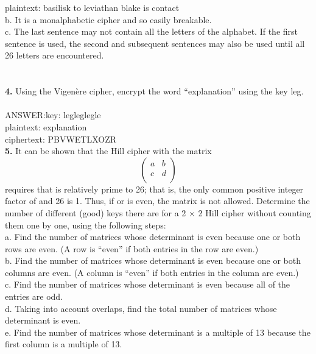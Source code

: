\documentclass[paper=a4, fontsize=11pt]{scrartcl} %
\numberwithin{equation}{section} %
\numberwithin{figure}{section} %
\numberwithin{table}{section} %
\begin{document}
plaintext:   basilisk to leviathan blake is contact\\
        b.      It is a monalphabetic cipher and so easily breakable.\\
        c.      The last sentence may not contain all the letters of the alphabet. If the first sentence is used, the second and subsequent sentences may also be used until all 26 letters are encountered.\\
\\
\\
\textbf{4.} Using the Vigenère cipher, encrypt the word “explanation” using the key leg.\\
\\
ANSWER:key:     legleglegle\\
    plaintext:  explanation\\
        ciphertext:     PBVWETLXOZR\\
\textbf{5.} It can be shown that the Hill cipher with the matrix
\begin{equation}       %
\left(                 %
  \begin{array}{cc}   %
    a & b\\  %
    c & d\\  %
  \end{array}
\right)                 %
\end{equation}
requires that is relatively prime to 26; that is, the only common positive integer factor of and 26 is 1. Thus, if or is even, the matrix is not allowed. Determine the number of different (good) keys there are for a 2 × 2 Hill cipher without counting them one by one, using the following steps:\\
a. Find the number of matrices whose determinant is even because one or both rows are even. (A row is “even” if both entries in the row are even.)\\
b. Find the number of matrices whose determinant is even because one or both columns are even. (A column is “even” if both entries in the column are even.)\\
c. Find the number of matrices whose determinant is even because all of the entries are odd.\\
d. Taking into account overlaps, find the total number of matrices whose determinant is even.\\
e. Find the number of matrices whose determinant is a multiple of 13 because the first column is a multiple of 13.\\
\end{document}
